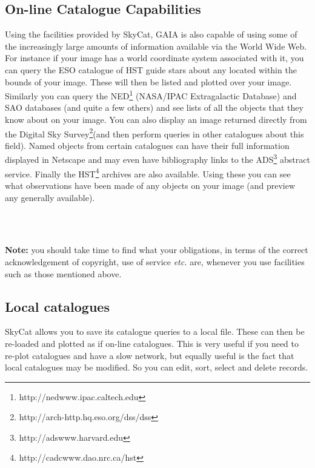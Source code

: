 \documentclass[twoside,11pt]{article}
\newcommand{\htmladdnormallinkfoot}[2]{#1\footnote{#2}}
\newcommand{\htmladdnormallink}[2]{#1}
\newcommand{\xlabel}[1]{}
\renewcommand{\_}{\texttt{\symbol{95}}}
\begin{document}
\subsection{\xlabel{online_catalogue_capabilities}On-line Catalogue Capabilities}
Using the facilities provided by
\htmladdnormallink{SkyCat}{http://archive.eso.org/skycat}, GAIA is
also capable of using some of the increasingly large amounts of
information available via the World Wide Web. For instance if your
image has a world coordinate system associated with it, you can query
the ESO catalogue of HST guide stars about any located within the
bounds of your image. These will then be listed and plotted over your
image.  Similarly you can query the
\htmladdnormallinkfoot{NED}{http://nedwww.ipac.caltech.edu}
(NASA/IPAC Extragalactic Database) and SAO databases (and quite a few
others) and see lists of all the objects that they know about on your
image. You can also display an image returned directly from the
\htmladdnormallinkfoot{Digital Sky Survey}
{http://arch-http.hq.eso.org/dss/dss}(and then perform queries in
other catalogues about this field). Named objects from certain
catalogues can have their full information displayed in
\htmladdnormallink{Netscape}{http://home.netscape.com} and may even
have bibliography links to the
\htmladdnormallinkfoot{ADS}{http://adswww.harvard.edu} abstract
service.  Finally the
\htmladdnormallinkfoot{HST}{http://cadcwww.dao.nrc.ca/hst} archives
are also available. Using these you can see what observations have
been made of any objects on your image (and preview any generally
available).
\begin{htmlonly}
\\
\\
\end{htmlonly}

{\bf Note:} you should take time to find what your obligations, in
terms of the correct acknowledgement of copyright, use of service
{\em etc.} are, whenever you use facilities such as those mentioned
above.

\subsection{Local catalogues}
SkyCat allows you to save its catalogue queries to a local file. These
can then be re-loaded and plotted as if on-line catalogues. This is
very useful if you need to re-plot catalogues and have a slow network,
but equally useful is the fact that local catalogues may be
modified. So you can edit, sort, select and delete records.
\end{document}
